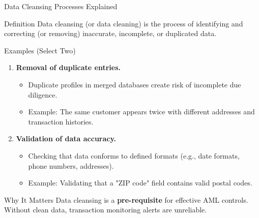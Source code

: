 \documentclass{beamer}
\begin{document}
	\begin{frame}{Data Cleansing Processes Explained}
		\begin{block}{Definition}
			Data cleansing (or data cleaning) is the process of identifying and correcting (or removing) inaccurate, incomplete, or duplicated data.
		\end{block}
		\begin{block}{Examples (Select Two)}
			\begin{enumerate}
				\item \textbf{Removal of duplicate entries.}
				\begin{itemize}
					\item Duplicate profiles in merged databases create risk of incomplete due diligence.
					\item Example: The same customer appears twice with different addresses and transaction histories.
				\end{itemize}
				\item \textbf{Validation of data accuracy.}
				\begin{itemize}
					\item Checking that data conforms to defined formats (e.g., date formats, phone numbers, addresses).
					\item Example: Validating that a "ZIP code" field contains valid postal codes.
				\end{itemize}
			\end{enumerate}
		\end{block}
		\begin{block}{Why It Matters}
			Data cleansing is a \textbf{pre-requisite} for effective AML controls. Without clean data, transaction monitoring alerts are unreliable.
		\end{block}
	\end{frame}
	
\end{document}
